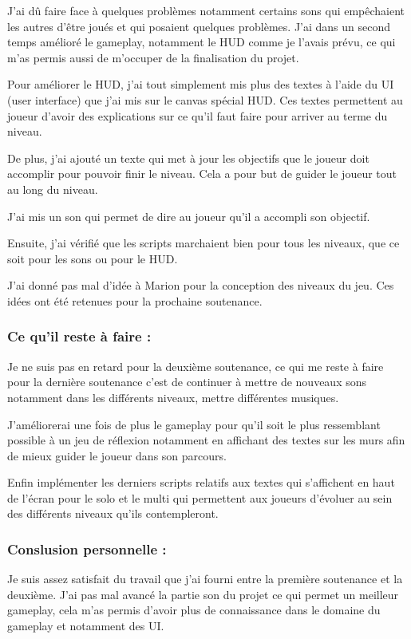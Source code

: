\documentclass{article}
\begin{document}
J’ai dû faire face à quelques problèmes notamment certains sons qui empêchaient les autres d’être joués et qui posaient quelques problèmes. 
J’ai dans un second temps amélioré le gameplay, notamment le HUD comme je l’avais prévu, ce qui m’as permis aussi de m’occuper de la finalisation du projet.

Pour améliorer le HUD, j’ai tout simplement mis plus des textes à l’aide du UI (user interface) que j’ai mis sur le canvas spécial HUD. Ces textes permettent au joueur d’avoir des explications sur ce qu’il faut faire pour arriver au terme du niveau.


De plus, j’ai ajouté un texte qui met à jour les objectifs que le joueur doit accomplir pour pouvoir finir le niveau. Cela a pour but de guider le joueur tout au long du niveau.

J’ai mis un son qui permet de dire au joueur qu’il a accompli son objectif.

Ensuite, j’ai vérifié que les scripts marchaient bien pour tous les niveaux, que ce soit pour les sons ou pour le HUD.

J’ai donné pas mal d’idée à Marion pour la conception des niveaux du jeu. Ces idées ont été retenues pour la prochaine soutenance.

\quad
		\subsubsection{Ce qu'il reste à faire :}


Je ne suis pas en retard pour la deuxième soutenance, ce qui me reste à faire pour la dernière soutenance c’est de continuer à mettre de nouveaux sons notamment dans les différents niveaux, mettre différentes musiques.

J’améliorerai une fois de plus le gameplay pour qu’il soit le plus ressemblant possible à un jeu de réflexion notamment en affichant des textes sur les murs afin de mieux guider le joueur dans son parcours.


Enfin implémenter les derniers scripts relatifs aux textes qui s’affichent en haut de l’écran pour le solo et le multi qui permettent aux joueurs d’évoluer au sein des différents niveaux qu’ils contempleront.

		\subsubsection{Conslusion personnelle :}

Je suis assez satisfait du travail que j'ai fourni entre la première soutenance et la deuxième. J'ai pas mal avancé la partie son du projet ce qui permet un meilleur gameplay, cela m'as permis d’avoir plus de connaissance dans le domaine du gameplay et notamment des UI.
\end{document}
